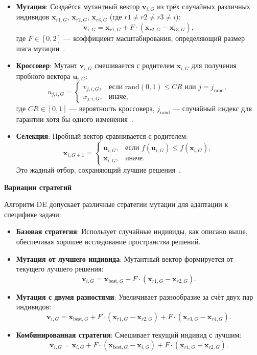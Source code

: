 \documentclass[a4paper]{article}
\begin{document}
\begin{itemize}
    \item \textbf{Мутация}: Создаётся мутантный вектор \( \mathbf{v}_{i,G} \) из трёх случайных различных индивидов \( \mathbf{x}_{r1,G} \), \( \mathbf{x}_{r2,G} \), \( \mathbf{x}_{r3,G} \) (где \( r1 \neq r2 \neq r3 \neq i \)):
    \[
    \mathbf{v}_{i,G} = \mathbf{x}_{r1,G} + F \cdot (\mathbf{x}_{r2,G} - \mathbf{x}_{r3,G}),
    \]
    где \( F \in [0,2] \) — коэффициент масштабирования, определяющий размер шага мутации~\cite{1,4}.

    \item \textbf{Кроссовер}: Мутант \( \mathbf{v}_{i,G} \) смешивается с родителем \( \mathbf{x}_{i,G} \) для получения пробного вектора \( \mathbf{u}_{i,G} \):
    \[
    u_{j,i,G} = 
    \begin{cases} 
    v_{j,i,G}, & \text{если } \text{rand}(0,1) \leq CR \text{ или } j = j_{\text{rand}}, \\
    x_{j,i,G}, & \text{иначе},
    \end{cases}
    \]
    где \( CR \in [0,1] \) — вероятность кроссовера, \( j_{\text{rand}} \) — случайный индекс для гарантии хотя бы одного изменения~\cite{1,4}.

    \item \textbf{Селекция}: Пробный вектор сравнивается с родителем:
    \[
    \mathbf{x}_{i,G+1} = 
    \begin{cases} 
    \mathbf{u}_{i,G}, & \text{если } f(\mathbf{u}_{i,G}) \leq f(\mathbf{x}_{i,G}), \\
    \mathbf{x}_{i,G}, & \text{иначе}.
    \end{cases}
    \]
    Это жадный отбор, сохраняющий лучшие решения~\cite{1,4}.
\end{itemize}

\textbf{Вариации стратегий}

Алгоритм DE допускает различные стратегии мутации для адаптации к специфике задачи:

\begin{itemize}
    \item \textbf{Базовая стратегия}: Использует случайные индивиды, как описано выше, обеспечивая хорошее исследование пространства решений.
    \item \textbf{Мутация от лучшего индивида}: Мутантный вектор формируется от текущего лучшего решения:
    \[
    \mathbf{v}_{i,G} = \mathbf{x}_{\text{best},G} + F \cdot (\mathbf{x}_{r1,G} - \mathbf{x}_{r2,G}).
    \]
    \item \textbf{Мутация с двумя разностями}: Увеличивает разнообразие за счёт двух пар индивидов:
    \[
    \mathbf{v}_{i,G} = \mathbf{x}_{\text{best},G} + F \cdot (\mathbf{x}_{r1,G} - \mathbf{x}_{r2,G}) + F \cdot (\mathbf{x}_{r3,G} - \mathbf{x}_{r4,G}).
    \]
    \item \textbf{Комбинированная стратегия}: Смешивает текущий индивид с лучшим:
    \[
    \mathbf{v}_{i,G} = \mathbf{x}_{i,G} + F \cdot (\mathbf{x}_{\text{best},G} - \mathbf{x}_{i,G}) + F \cdot (\mathbf{x}_{r1,G} - \mathbf{x}_{r2,G}).
    \]
\end{itemize}
\end{document}
